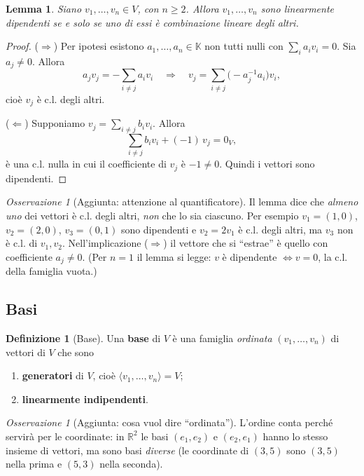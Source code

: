 \documentclass[11pt,a4paper]{article}
\newcommand{\RR}{\mathbb{R}}
\newcommand{\KK}{\mathbb{K}}
\theoremstyle{plain}
\newtheorem{lemma}[prop]{Lemma}
\theoremstyle{definition}
\newtheorem{defn}[prop]{Definizione}
\theoremstyle{remark}
\newtheorem{oss}[prop]{Osservazione}
\begin{document}
\begin{lemma}\label{lemma:dipendenza}
Siano $v_1,\dots,v_n\in V$, con $n\ge2$. Allora $v_1,\dots,v_n$ sono linearmente dipendenti se e solo se uno di essi è combinazione lineare degli altri.
\end{lemma}

\begin{proof}
($\Rightarrow$) Per ipotesi esistono $a_1,\dots,a_n\in\KK$ non tutti nulli con $\sum_ia_iv_i=0$. Sia $a_j\neq0$. Allora
\[
  a_jv_j=-\sum_{i\neq j}a_iv_i
  \quad\Longrightarrow\quad
  v_j=\sum_{i\neq j}\bigl(-a_j^{-1}a_i\bigr)v_i ,
\]
cioè $v_j$ è c.l. degli altri.

($\Leftarrow$) Supponiamo $v_j=\sum_{i\ne j}b_iv_i$. Allora
\[
  \sum_{i\neq j}b_iv_i+(-1)\,v_j=0_V ,
\]
è una c.l. nulla in cui il coefficiente di $v_j$ è $-1\neq0$. Quindi i vettori sono dipendenti.
\end{proof}

\begin{oss}
[Aggiunta: attenzione al quantificatore]
Il lemma dice che \emph{almeno uno} dei vettori è c.l. degli altri, \emph{non} che lo sia ciascuno.
Per esempio $v_1=(1,0)$, $v_2=(2,0)$, $v_3=(0,1)$ sono dipendenti e $v_2=2v_1$ è c.l. degli altri, ma $v_3$ non è c.l. di $v_1,v_2$.
Nell'implicazione ($\Rightarrow$) il vettore che si ``estrae'' è quello con coefficiente $a_j\neq0$.
(Per $n=1$ il lemma si legge: $v$ è dipendente $\iff v=0$, la c.l. della famiglia vuota.)
\end{oss}

\subsection{Basi}

\begin{defn}[Base]
Una \textbf{base} di $V$ è una famiglia \emph{ordinata} $(v_1,\dots,v_n)$ di vettori di $V$ che sono
\begin{enumerate}[label=(\roman*)]
  \item \textbf{generatori} di $V$, cioè $\langle v_1,\dots,v_n\rangle=V$;
  \item \textbf{linearmente indipendenti}.
\end{enumerate}
\end{defn}

\begin{oss}[Aggiunta: cosa vuol dire ``ordinata'']
L'ordine conta perché servirà per le coordinate: in $\RR^2$ le basi $(e_1,e_2)$ e $(e_2,e_1)$ hanno lo stesso insieme di vettori, ma sono basi \emph{diverse} (le coordinate di $(3,5)$ sono $(3,5)$ nella prima e $(5,3)$ nella seconda).
\end{oss}
\end{document}
